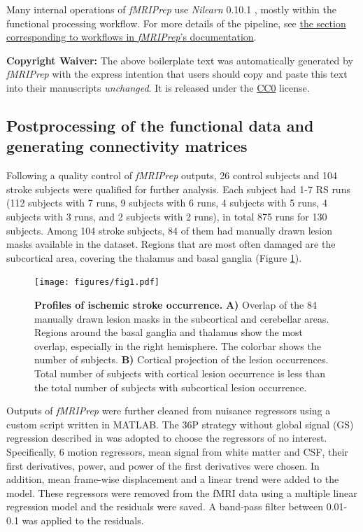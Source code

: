 \documentclass[fleqn,10pt]{wlscirep}
\begin{document}
Many internal operations of \emph{fMRIPrep} use \emph{Nilearn} 0.10.1
\citep[RRID:SCR\_001362]{abraham2014machine}, mostly within the functional
processing workflow. For more details of the pipeline, see
\href{https://fmriprep.readthedocs.io/en/latest/workflows.html}{the
section corresponding to workflows in \emph{fMRIPrep}'s documentation}.

\textbf{Copyright Waiver:} The above boilerplate text was automatically generated by \emph{fMRIPrep} with the express intention that users should copy and paste
this text into their manuscripts \emph{unchanged}. It is released under
the \href{https://creativecommons.org/publicdomain/zero/1.0/}{CC0}
license.

\subsection*{Postprocessing of the functional data and generating connectivity matrices}
Following a quality control of \emph{fMRIPrep} outputs, 26 control subjects and 104 stroke subjects were qualified for further analysis. Each subject had 1-7 RS runs (112 subjects with 7 runs, 9 subjects with 6 runs, 4 subjects with 5 runs, 4 subjects with 3 runs, and 2 subjects with 2 runs), in total  875 runs for 130 subjects. Among 104 stroke subjects, 84 of them had manually drawn lesion masks available in the dataset. Regions that are most often damaged are the subcortical area, covering the thalamus and basal ganglia (Figure \ref{fig:lesion_locations}).

\begin{figure}[]
\centering
\texttt{[image: figures/fig1.pdf]}
\caption{\label{fig:lesion_locations} \textbf{Profiles of ischemic stroke occurrence.} \textbf{A) } Overlap of the 84 manually drawn lesion masks in the subcortical and cerebellar areas. Regions around the basal ganglia and thalamus show the most overlap, especially in the right hemisphere. The colorbar shows the number of subjects. \textbf{B) } Cortical projection of the lesion occurrences. Total number of subjects with cortical lesion occurrence is less than the total number of subjects with subcortical lesion occurrence.  } 
\end{figure}

Outputs of \emph{fMRIPrep} were further cleaned from nuisance regressors using a custom script written in MATLAB. The 36P strategy without global signal (GS) regression described in \citet{satterthwaite_2013} was adopted to choose the regressors of no interest. Specifically, 6 motion regressors, mean signal from white matter and CSF, their first derivatives, power, and power of the first derivatives were chosen. In addition, mean frame-wise displacement and a linear trend were added to the model. These regressors were removed from the fMRI data using a multiple linear regression model and the residuals were saved. A band-pass filter between 0.01-0.1 was applied to the residuals. 
\end{document}
